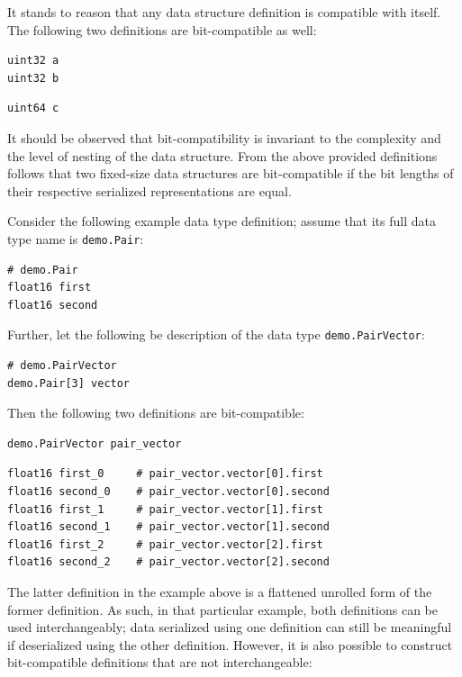 It stands to reason that any data structure definition is compatible with itself.
The following two definitions are bit-compatible as well:

\begin{verbatim}
uint32 a
uint32 b
\end{verbatim}

\begin{verbatim}
uint64 c
\end{verbatim}

It should be observed that bit-compatibility is invariant to the complexity and the level of nesting
of the data structure.
From the above provided definitions follows that two fixed-size data structures are bit-compatible if the
bit lengths of their respective serialized representations are equal.

Consider the following example data type definition; assume that its full data type name is
\verb|demo.Pair|:

\begin{verbatim}
# demo.Pair
float16 first
float16 second
\end{verbatim}

Further, let the following be description of the data type \verb|demo.PairVector|:

\begin{verbatim}
# demo.PairVector
demo.Pair[3] vector
\end{verbatim}

Then the following two definitions are bit-compatible:

\begin{verbatim}
demo.PairVector pair_vector
\end{verbatim}

\begin{verbatim}
float16 first_0     # pair_vector.vector[0].first
float16 second_0    # pair_vector.vector[0].second
float16 first_1     # pair_vector.vector[1].first
float16 second_1    # pair_vector.vector[1].second
float16 first_2     # pair_vector.vector[2].first
float16 second_2    # pair_vector.vector[2].second
\end{verbatim}

The latter definition in the example above is a flattened unrolled form of the former definition.
As such, in that particular example, both definitions can be used interchangeably;
data serialized using one definition can still be meaningful if deserialized using the other definition.
However, it is also possible to construct bit-compatible definitions that are not interchangeable:


